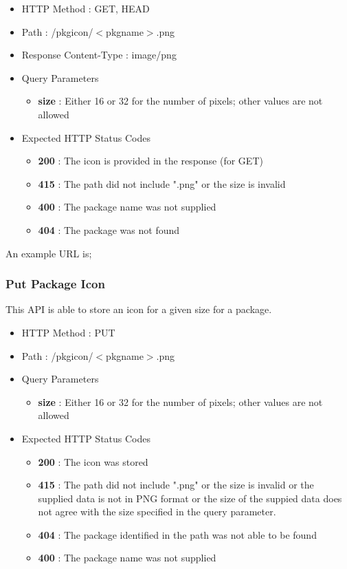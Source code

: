 \begin{itemize}
\item HTTP Method : GET, HEAD
\item Path : /pkgicon/$<$pkgname$>$.png
\item Response Content-Type : image/png
\item Query Parameters
  \begin{itemize}
  \item {\bf size} : Either 16 or 32 for the number of pixels; other values are not allowed
  \end{itemize}
\item Expected HTTP Status Codes
  \begin{itemize}
  \item {\bf 200} : The icon is provided in the response (for GET)
  \item {\bf 415} : The path did not include ".png" or the size is invalid
  \item {\bf 400} : The package name was not supplied
  \item {\bf 404} : The package was not found
  \end{itemize}
\end{itemize}

An example URL is;


\subsubsection{Put Package Icon}

This API is able to store an icon for a given size for a package.

\begin{itemize}
\item HTTP Method : PUT
\item Path : /pkgicon/$<$pkgname$>$.png
\item Query Parameters
  \begin{itemize}
  \item {\bf size} : Either 16 or 32 for the number of pixels; other values are not allowed
  \end{itemize}
\item Expected HTTP Status Codes
  \begin{itemize}
  \item {\bf 200} : The icon was stored
  \item {\bf 415} : The path did not include ".png" or the size is invalid or the supplied data is not in PNG format or the size of the suppied data does not agree with the size specified in the query parameter.
  \item {\bf 404} : The package identified in the path was not able to be found
  \item {\bf 400} : The package name was not supplied
  \end{itemize}
\end{itemize}

